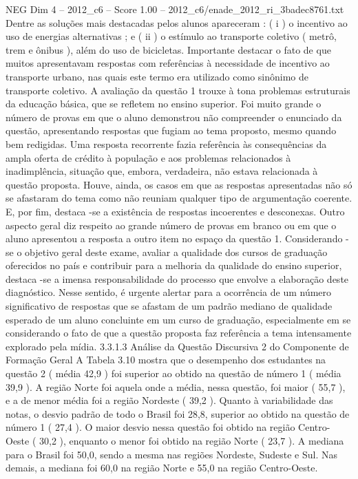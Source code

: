 \begin{textsample}{NEG Dim 4 – 2012\_c6 – Score 1.00 – 2012\_c6/enade\_2012\_ri\_3badec8761.txt}
Dentre as soluções mais destacadas pelos alunos apareceram : ( i ) o incentivo ao uso de energias alternativas ; e ( ii ) o estímulo ao transporte coletivo ( metrô, trem e ônibus ), além do uso de bicicletas.
Importante destacar o fato de que muitos apresentavam respostas com referências à necessidade de incentivo ao transporte urbano, nas quais este termo era utilizado como sinônimo de transporte coletivo.
A avaliação da questão 1 trouxe à tona problemas estruturais da educação básica, que se refletem no ensino superior.
Foi muito grande o número de provas em que o aluno demonstrou não compreender o enunciado da questão, apresentando respostas que fugiam ao tema proposto, mesmo quando bem redigidas.
Uma resposta recorrente fazia referência às consequências da ampla oferta de crédito à população e aos problemas relacionados à inadimplência, situação que, embora, verdadeira, não estava relacionada à questão proposta.
Houve, ainda, os casos em que as respostas apresentadas não só se afastaram do tema como não reuniam qualquer tipo de argumentação coerente.
E, por fim, destaca -se a existência de respostas incoerentes e desconexas.
Outro aspecto geral diz respeito ao grande número de provas em branco ou em que o aluno apresentou a resposta a outro item no espaço da questão 1.
Considerando -se o objetivo geral deste exame, avaliar a qualidade dos cursos de graduação oferecidos no país e contribuir para a melhoria da qualidade do ensino superior, destaca -se a imensa responsabilidade do processo que envolve a elaboração deste diagnóstico.
Nesse sentido, é urgente alertar para a ocorrência de um número significativo de respostas que se afastam de um padrão mediano de qualidade esperado de um aluno concluinte em um curso de graduação, especialmente em se considerando o fato de que a questão proposta faz referência a tema intensamente explorado pela mídia. 3.3.1.3 Análise da Questão Discursiva 2 do Componente de Formação Geral A Tabela 3.10 mostra que o desempenho dos estudantes na questão 2 ( média 42,9 ) foi superior ao obtido na questão de número 1 ( média 39,9 ).
A região Norte foi aquela onde a média, nessa questão, foi maior ( 55,7 ), e a de menor média foi a região Nordeste ( 39,2 ).
Quanto à variabilidade das notas, o desvio padrão de todo o Brasil foi 28,8, superior ao obtido na questão de número 1 ( 27,4 ).
O maior desvio nessa questão foi obtido na região Centro-Oeste ( 30,2 ), enquanto o menor foi obtido na região Norte ( 23,7 ).
A mediana para o Brasil foi 50,0, sendo a mesma nas regiões Nordeste, Sudeste e Sul.
Nas demais, a mediana foi 60,0 na região Norte e 55,0 na região Centro-Oeste.

\end{textsample}
